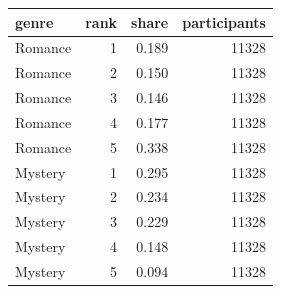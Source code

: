 \begin{tabular}{lrrr}
\toprule
genre & rank & share & participants \\
\midrule
Romance & 1 & 0.189 & 11328 \\
Romance & 2 & 0.150 & 11328 \\
Romance & 3 & 0.146 & 11328 \\
Romance & 4 & 0.177 & 11328 \\
Romance & 5 & 0.338 & 11328 \\
Mystery & 1 & 0.295 & 11328 \\
Mystery & 2 & 0.234 & 11328 \\
Mystery & 3 & 0.229 & 11328 \\
Mystery & 4 & 0.148 & 11328 \\
Mystery & 5 & 0.094 & 11328 \\
\bottomrule
\end{tabular}
